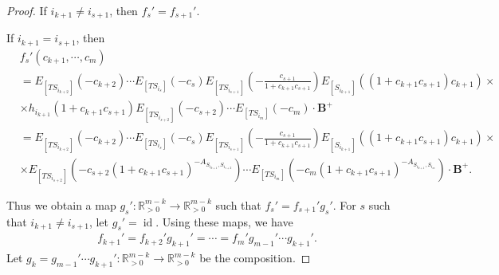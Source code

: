 \documentclass[10pt,a4paper]{amsart}
\begin{document}
\begin{proof}
    If $i_{k+1}\neq i_{s+1}$, then $f_s'=f_{s+1}'$.

    If $i_{k+1}=i_{s+1}$, then 
    \begin{align*}
        &f_s'(c_{k+1},\cdots,c_m)\\
        &=E_{[TS_{i_{k+2}}]}(-c_{k+2})\cdots E_{[TS_{i_{s}}]}(-c_s) E_{[TS_{i_{s+1}}]}(-\frac{c_{s+1}}{1+c_{k+1}c_{s+1}}) E_{[S_{i_{k+1}}]}((1+c_{k+1}c_{s+1})c_{k+1}) \times \\
        &\times h_{i_{k+1}}(1+c_{k+1}c_{s+1}) E_{[TS_{i_{s+2}}]}(-c_{s+2})\cdots E_{[TS_{i_m}]}(-c_m)\cdot \mathbf{B}^+\\
        &=E_{[TS_{i_{k+2}}]}(-c_{k+2})\cdots E_{[TS_{i_{s}}]}(-c_s) E_{[TS_{i_{s+1}}]}(-\frac{c_{s+1}}{1+c_{k+1}c_{s+1}}) E_{[S_{i_{k+1}}]}((1+c_{k+1}c_{s+1})c_{k+1})\times \\
        &\times E_{[TS_{i_{s+2}}]}(-c_{s+2}(1+c_{k+1}c_{s+1})^{-A_{S_{i_{k+1}},S_{i_{s+2}}}})\cdots E_{[TS_{i_m}]}(-c_m(1+c_{k+1}c_{s+1})^{-A_{S_{i_{k+1}},S_{i_m}}})\cdot \mathbf{B}^+.
    \end{align*}

    Thus we obtain a map $g_s':\mathbb{R}_{>0}^{m-k}\rightarrow \mathbb{R}_{>0}^{m-k}$ such that $f_s'=f_{s+1}'g_s'$.
    For $s$ such that $i_{k+1}\neq i_{s+1}$, let $g_s'=\operatorname{id}$.
    Using these maps, we have 
    \begin{align*}
        f_{k+1}'=f_{k+2}'g_{k+1}'=\cdots=f_m'g_{m-1}'\cdots g_{k+1}'.
    \end{align*}
    Let $g_k=g_{m-1}'\cdots g_{k+1}':\mathbb{R}_{>0}^{m-k}\rightarrow \mathbb{R}_{>0}^{m-k}$ be the composition.


\end{proof}
\end{document}
